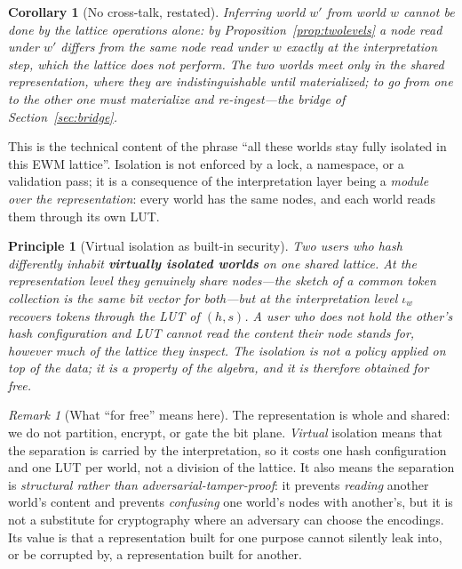 \documentclass[11pt,a4paper]{article}
\newtheorem{principle}{Principle}[section]
\newtheorem{corollary}[theorem]{Corollary}
\theoremstyle{remark}
\newtheorem{remark}[theorem]{Remark}
\newcommand{\iotaw}{\ensuremath{\iota_{w}}}         %
\begin{document}
\begin{corollary}[No cross-talk, restated]
\label{cor:notalk}
Inferring world $w'$ from world $w$ cannot be done by the lattice operations
alone: by Proposition~\ref{prop:twolevels} a node read under $w'$ differs from
the same node read under $w$ exactly at the interpretation step, which the
lattice does not perform. The two worlds meet only in the shared representation,
where they are indistinguishable until materialized; to go from one to the
other one must materialize and re-ingest---the bridge of
Section~\ref{sec:bridge}.
\end{corollary}

This is the technical content of the phrase ``all these worlds stay fully
isolated in this EWM lattice''. Isolation is not enforced by a lock, a namespace,
or a validation pass; it is a consequence of the interpretation layer being a
\emph{module over the representation}: every world has the same nodes, and each
world reads them through its own LUT.

\begin{principle}[Virtual isolation as built-in security]
\label{prin:virtual-isolation}
Two users who hash differently inhabit \textbf{virtually isolated worlds} on one
shared lattice. At the representation level they genuinely share nodes---the
sketch of a common token collection is the same bit vector for both---but at the
interpretation level $\iotaw$ recovers tokens through the LUT of $(h,s)$. A user
who does not hold the other's hash configuration and LUT cannot read the
content their node stands for, however much of the lattice they inspect. The
isolation is not a policy applied on top of the data; it is a property of the
algebra, and it is therefore obtained for free.
\end{principle}

\begin{remark}[What ``for free'' means here]
The representation is whole and shared: we do not partition, encrypt, or gate
the bit plane. \emph{Virtual} isolation means that the separation is carried by
the interpretation, so it costs one hash configuration and one LUT per world,
not a division of the lattice. It also means the separation is
\emph{structural rather than adversarial-tamper-proof}: it prevents
\emph{reading} another world's content and prevents \emph{confusing} one world's
nodes with another's, but it is not a substitute for cryptography where an
adversary can choose the encodings. Its value is that a representation built
for one purpose cannot silently leak into, or be corrupted by, a representation
built for another.
\end{remark}
\end{document}
